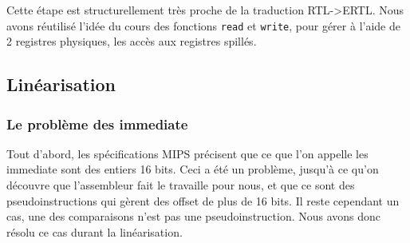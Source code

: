 \documentclass[a4paper]{article}
\begin{document}
Cette étape est structurellement très proche de la traduction RTL->ERTL.
Nous avons réutilisé l'idée du cours des fonctions \texttt{read} et
\texttt{write}, pour gérer à l'aide de 2 registres physiques,
les accès aux registres spillés. 

\subsection{Linéarisation}

\subsubsection{Le problème des immediate}
Tout d'abord, les spécifications MIPS précisent que ce que l'on appelle
les
 immediate sont des entiers 16 bits. Ceci a été un problème, jusqu'à ce
 qu'on découvre que l'assembleur fait le travaille pour nous, et que ce
 sont des pseudoinstructions qui gèrent des offset de plus de 16 bits.
 Il reste cependant un cas, une des comparaisons n'est pas une
 pseudoinstruction. Nous avons donc résolu ce cas durant la linéarisation.
\end{document}
